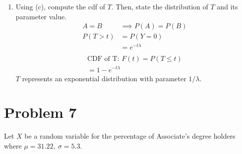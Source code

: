 \documentclass{article}
\begin{document}
\begin{enumerate}[label=\alph*)]
\begin{description}
          \end{description}
    \item Using (c), compute the cdf of \(T\). Then, state the distribution of \(T\) and its parameter value.
          \begin{align*}
              A = B    & \implies P(A) = P(B) \\
              P(T > t) & =  P(Y = 0)          \\
                       & = e^{-t\lambda}      \\
          \end{align*}
          \begin{align*}
              \text{CDF of T: } F(t) =  P(T \leq t) \\
              = 1 - e^{-t\lambda}
          \end{align*}
          \(T\) represents an exponential distribution with parameter \(1/\lambda\).
\end{enumerate}

\pagebreak

\section*{Problem 7}
Let \(X\) be a random variable for the percentage of Associate's degree holders where \(\mu = 31.22,\ \sigma = 5.3\).
\end{document}
